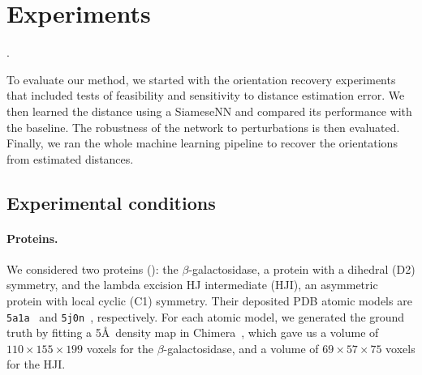 \section{Experiments}\label{sec:experiments}



.

To evaluate our method, we started with the orientation recovery experiments that included tests of feasibility and sensitivity to distance estimation error.
We then learned the distance using a SiameseNN and compared its performance with the baseline.
The robustness of the network to perturbations is then evaluated.
Finally, we ran the whole machine learning pipeline to recover the orientations from estimated distances.

\subsection{Experimental conditions}\label{sec:results:data}

\paragraph{Proteins.}
We considered two proteins (): the $\beta$-galactosidase, a protein with a dihedral (D2) symmetry, and the lambda excision HJ intermediate (HJI), an asymmetric protein with local cyclic (C1) symmetry.
Their deposited PDB atomic models are \texttt{5a1a}~\cite{bartesaghi2015betagal} and \texttt{5j0n}~\cite{laxmikanthan2016structure}, respectively.
For each atomic model, we generated the ground truth by fitting a 5\AA\ density map in Chimera~\cite{pettersen2004ucsf}, which gave us a volume of $110 \times 155 \times 199$ voxels for the $\beta$-galactosidase, and a volume of $69 \times 57 \times 75$ voxels for the HJI.


